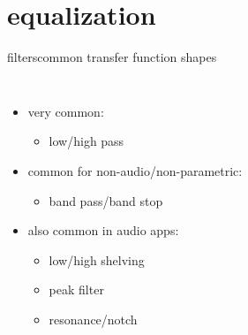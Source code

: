     \section{equalization}
	\begin{frame}{filters}{common transfer function shapes}

            \begin{columns}
            \begin{itemize}
                \item   very common:
                    \begin{itemize}
                        \item   low/high pass
                    \end{itemize}
                \smallskip
                \item<3->   common for non-audio/non-parametric:
                    \begin{itemize}
                        \item   band pass/band stop
                    \end{itemize}
                \smallskip
                \item<4->   also common in audio apps:
                    \begin{itemize}
                        \item<4->   low/high shelving
                        \item<5->   peak filter
                        \item<6->   resonance/notch
                    \end{itemize}
            \end{itemize}
                \vspace{-3mm}
\end{columns}
\end{frame}
